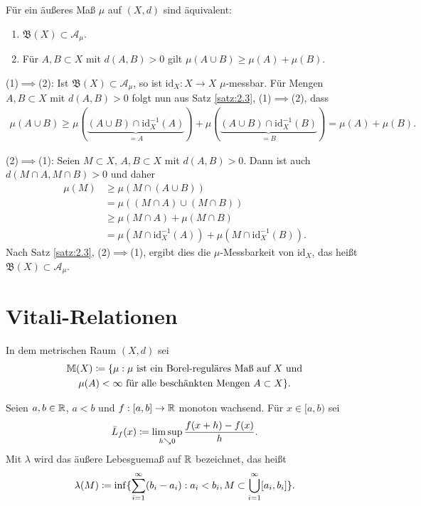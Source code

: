 \documentclass[a4paper,twoside,DIV15,BCOR12mm]{scrbook}
\newcommand{\A}{\mathcal A}
\newcommand{\borel}{\mathfrak B}
\newcommand{\id}{\mathrm{id}}
\newcommand{\downto}{\mathrel\searrow}
\begin{document}
\begin{satz}
\label{satz:2.4}
Für ein äußeres Maß $\mu$ auf $(X,d)$ sind äquivalent:
\begin{enumerate}
\item $\borel(X) \subset \A_\mu$.
\item Für $A,B\subset X$ mit $d(A,B)>0$ gilt $\mu(A\cup B) \ge \mu(A) + \mu(B)$.
\end{enumerate}
\end{satz}

\begin{beweis}
(1)$\implies$(2): Ist $\borel(X)\subset \A_\mu$, so ist $\id_X: X\to X$ $\mu$-messbar. Für Mengen $A,B\subset X$ mit $d(A,B)>0$ folgt nun aus Satz \ref{satz:2.3}, (1)$\implies$(2), dass 
\begin{align*}
\mu(A\cup B) \ge \mu( \underbrace{(A\cup B) \cap \id_X^{-1}(A)}_{=A} ) + \mu( \underbrace{(A\cup B) \cap \id_X^{-1}(B)}_{=B}) = \mu(A) + \mu(B).
\end{align*}

(2)$\implies$(1): Seien $M\subset X$, $A,B\subset X$ mit $d(A,B)>0$. Dann ist auch $d(M\cap A, M\cap B)>0$ und daher
\begin{align*}
\mu(M)
&\ge \mu( M\cap (A\cup B) )\\
&= \mu( (M\cap A)\cup (M\cap B) )\\
&\ge \mu(M\cap A) + \mu(M\cap B)\\
&= \mu(M \cap \id_X^{-1}(A)) + \mu(M \cap \id_X^{-1}(B)).
\end{align*}
Nach Satz \ref{satz:2.3}, (2)$\implies$(1), ergibt dies die $\mu$-Messbarkeit von $\id_X$, das heißt $\borel(X)\subset \A_\mu$.
\end{beweis}

\section{Vitali-Relationen}

In dem metrischen Raum $(X,d)$ sei 
\begin{multline*}
\mathbb M(X) \da \{\mu: \text{$\mu$ ist ein Borel-reguläres Maß auf $X$ und}\\\text{$\mu(A)<\infty$ für alle beschänkten Mengen $A\subset X$}\}.
\end{multline*}

\begin{motivation}
Seien $a,b\in\mathbb{R}$, $a<b$ und $f:[a,b]\to \mathbb{R}$ monoton wachsend. Für $x\in[a,b)$ sei 
\[
\bar L_f(x) \da \limsup_{h\downto0} \frac{f(x+h) - f(x)}{h}.
\]
Mit $\lambda$ wird das äußere Lebesguemaß auf $\mathbb{R}$ bezeichnet, das heißt
\[
\lambda(M) \da\inf\{\sum_{i=1}^\infty (b_i-a_i): a_i < b_i, M\subset \bigcup_{i=1}^\infty [a_i, b_i]\}.
\]
\end{motivation}
\end{document}
